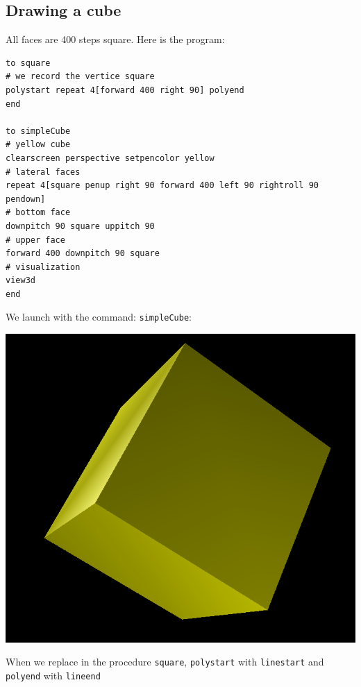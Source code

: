 \subsection{Drawing a cube}
\noindent All faces are 400 steps square. Here is the program:
\begin{verbatim}
to square
# we record the vertice square
polystart repeat 4[forward 400 right 90] polyend
end

to simpleCube
# yellow cube 
clearscreen perspective setpencolor yellow
# lateral faces
repeat 4[square penup right 90 forward 400 left 90 rightroll 90 pendown]
# bottom face 
downpitch 90 square uppitch 90
# upper face
forward 400 downpitch 90 square
# visualization
view3d
end
\end{verbatim}
We launch with the command: \texttt{simpleCube}:
\begin{center}
\includegraphics*[scale=0.4]{pics/3dCube1.png}
\end{center}
When we replace in the procedure \texttt{square}, \texttt{polystart} with \texttt{linestart} and \texttt{polyend} with \texttt{lineend}
